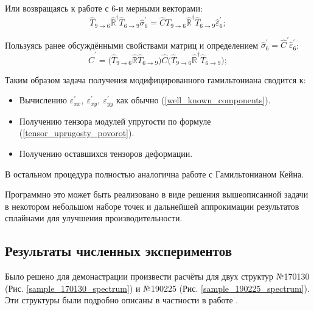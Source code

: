 \documentclass[../main.tex]{subfiles}
\newcommand{\vep}{\varepsilon}
\begin{document}
    Или возвращаясь к работе с 6-и мерными векторами:
    \begin{equation}
        \hat{T}_{9 \rightarrow 6} \hat{\mathbb{R}}^\dagger \hat{T}_{6 \rightarrow 9} \hat{\sigma}^{'}_{6} = \hat{C} T_{9 \rightarrow 6} \hat{\mathbb{R}}^\dagger \hat{T}_{6 \rightarrow 9} \hat{\vep}^{'}_{6};
    \end{equation}

    Пользуясь ранее обсуждёнными свойствами матриц и определением ${\hat{\sigma}_6^{'} = \hat{C}^{'} \hat{\vep}_6^{'}}$:
    \begin{equation}
        \label{tensor_uprugosty_povorot}
        \hat{C}^{'} =  \big(\hat{T}_{9 \rightarrow 6} \hat{\mathbb{R}} \hat{T}_{6 \rightarrow 9}\big) \hat{C} \big(\hat{T}_{9 \rightarrow 6} \hat{\mathbb{R}}^\dagger \hat{T}_{6 \rightarrow 9}\big);
    \end{equation}



    Таким образом задача получения модифицированного гамильтониана сводится к:

    \begin{itemize}
        \item Вычислению $\vep_{xx}^{'},~\vep_{xy}^{'},~\vep_{yy}^{'}$ как обычно (\ref{well_known_components}).
        \item Получению тензора модулей упругости по формуле (\ref{tensor_uprugosty_povorot}).
        \item Получению оставшихся тензоров деформации.
    \end{itemize}

    В остальном процедура полностью аналогична работе с Гамильтонианом Кейна.

    Программно это может быть реализовано в виде решения вышеописанной задачи в некотором небольшом наборе точек и дальнейшей аппрокимации результатов сплайнами для улучшения производительности.


    \subsection{Результаты численных экспериментов}

    Было решено для демонастрации произвести расчёты для двух структур №170130
    (Рис. \ref{sample_170130_spectrum}) и №190225 (Рис. \ref{sample_190225_spectrum}). 
    Эти структуры были подробно описаны в частности в работе \cite{MineNanophysics2020}.
\end{document}
